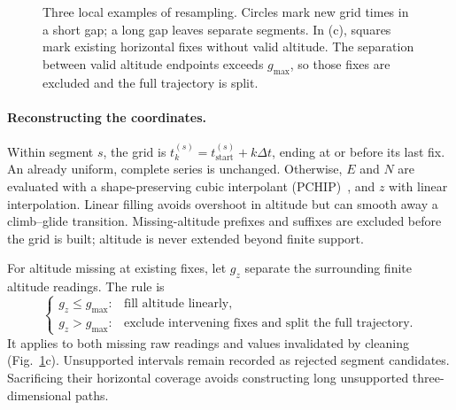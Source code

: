 \begin{figure}[htbp]
  \caption{Three local examples of resampling. Circles mark new grid times in a short
  gap; a long gap leaves separate segments. In (c), squares mark existing horizontal
  fixes without valid altitude. The separation between valid altitude endpoints exceeds
  $g_{\max}$, so those fixes are excluded and the full trajectory is split.}
  \label{fig:uniform-sampling-schematic}
\end{figure}

\paragraph{Reconstructing the coordinates.}
Within segment $s$, the grid is $t_k^{(s)}=t_{\mathrm{start}}^{(s)}+k\Delta t$,
ending at or before its last fix. An already uniform, complete series is unchanged.
Otherwise, $E$ and $N$ are evaluated with a shape-preserving cubic interpolant
(PCHIP)~\cite{fritsch1984}, and $z$ with linear interpolation. Linear filling avoids overshoot in altitude
but can smooth away a climb--glide transition. Missing-altitude prefixes and suffixes
are excluded before the grid is built; altitude is never extended beyond finite support.

For altitude missing at existing fixes, let $g_z$ separate the surrounding finite
altitude readings. The rule is
\[
 \begin{cases}
  g_z\le g_{\max}: & \text{fill altitude linearly},\\
  g_z>g_{\max}: & \text{exclude intervening fixes and split the full trajectory}.
 \end{cases}
\]
It applies to both missing raw readings and values invalidated by cleaning
(Fig.~\ref{fig:uniform-sampling-schematic}c). Unsupported intervals remain
recorded as rejected segment candidates. Sacrificing their horizontal coverage
avoids constructing long unsupported three-dimensional paths.

